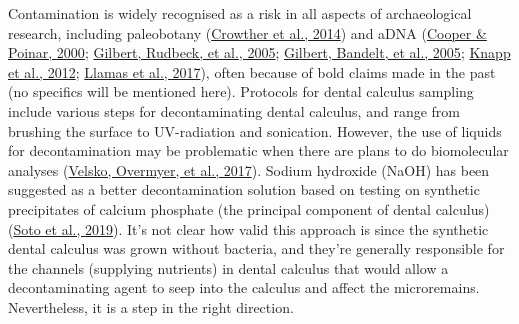 \documentclass[
  letterpaper,
]{book}
\begin{document}
Contamination is widely recognised as a risk in all aspects of
archaeological research, including paleobotany
(\protect\hyperlink{ref-crowtherDocumentingContamination2014}{Crowther
et al., 2014}) and aDNA
(\protect\hyperlink{ref-cooperAncientDNA2000}{Cooper \& Poinar, 2000};
\protect\hyperlink{ref-gilbertBiochemicalPhysical2005}{Gilbert, Rudbeck,
et al., 2005};
\protect\hyperlink{ref-gilbertAssessingAncient2005}{Gilbert, Bandelt, et
al., 2005}; \protect\hyperlink{ref-knappSettingStage2012}{Knapp et al.,
2012}; \protect\hyperlink{ref-llamasFieldLaboratory2017}{Llamas et al.,
2017}), often because of bold claims made in the past (no specifics will
be mentioned here). Protocols for dental calculus sampling include
various steps for decontaminating dental calculus, and range from
brushing the surface to UV-radiation and sonication. However, the use of
liquids for decontamination may be problematic when there are plans to
do biomolecular analyses
(\protect\hyperlink{ref-velskoDentalCalculus2017}{Velsko, Overmyer, et
al., 2017}). Sodium hydroxide (NaOH) has been suggested as a better
decontamination solution based on testing on synthetic precipitates of
calcium phosphate (the principal component of dental calculus)
(\protect\hyperlink{ref-sotoCharacterizationDecontamination2019}{Soto et
al., 2019}). It's not clear how valid this approach is since the
synthetic dental calculus was grown without bacteria, and they're
generally responsible for the channels (supplying nutrients) in dental
calculus that would allow a decontaminating agent to seep into the
calculus and affect the microremains. Nevertheless, it is a step in the
right direction.
\end{document}
